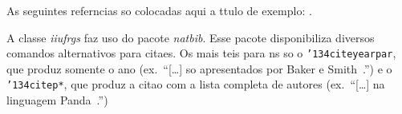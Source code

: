 \documentclass[diss]{template/setrem}
\begin{document}
As seguintes referncias so colocadas aqui a ttulo de exemplo:
\cite{Andrews:CP-91, Silberschatz:OSC-3-91, Wilson:MME-01}.

A classe \emph{iiufrgs} faz uso do pacote \emph{natbib}. Esse pacote
disponibiliza diversos comandos alternativos para
citaes. Os mais teis para ns so o \texttt{\char'134citeyearpar},
que produz somente o ano (ex.~``[\ldots] so apresentados por Baker e
Smith~\citeyearpar{Baker:PP-96}.'') e o
\texttt{\char'134citep*}, que produz a citao com a lista
completa de autores (ex.~``[\ldots] na linguagem Panda~\citep*{Assenmacher:Panda-ECOOP93}.'')

%
\end{document}
